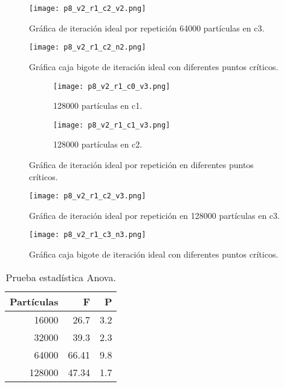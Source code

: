 \documentclass{article}
\begin{document}
\begin{figure}[H]
\centering
\texttt{[image: p8\_v2\_r1\_c2\_v2.png]}
\caption{\label{fig3} Gráfica de iteración ideal por repetición 64000 partículas en c3.}
\end{figure}

\begin{figure}[H]
\centering
\texttt{[image: p8\_v2\_r1\_c2\_n2.png]}
\caption{\label{fig3} Gráfica caja bigote de iteración ideal con diferentes puntos críticos.}
\end{figure}

\begin{figure}[H]
\centering
\begin{subfigure}[b]{0.40\linewidth}
\texttt{[image: p8\_v2\_r1\_c0\_v3.png]}
\caption{128000 partículas en c1.}
\end{subfigure}
\begin{subfigure}[b]{0.40\linewidth}
\texttt{[image: p8\_v2\_r1\_c1\_v3.png]}
\caption{128000 partículas en c2.}
\end{subfigure}
\caption{Gráfica de iteración ideal por repetición en diferentes puntos críticos.}
\label{fig:westminster}
\end{figure}

\begin{figure}[H]
\centering
\texttt{[image: p8\_v2\_r1\_c2\_v3.png]}
\caption{\label{fig3} Gráfica de iteración ideal por repetición en 128000 partículas en c3.}
\end{figure}

\begin{figure}[H]
\centering
\texttt{[image: p8\_v2\_r1\_c3\_n3.png]}
\caption{\label{fig3} Gráfica caja bigote de iteración ideal con diferentes puntos críticos.}
\end{figure}

\begin{table}[h!]
\centering
\caption{Prueba estadística Anova.}
 \begin{tabular}{||r r r||} 
 \hline
 Partículas & F & P  \\ [0.5ex] 
 \hline\hline
 16000 & 26.7 & 3.2 \\
 \hline
 32000 & 39.3 & 2.3\\ 
 \hline
 64000 & 66.41 & 9.8  \\
 \hline
 128000 & 47.34 & 1.7 \\
 \hline
\end{tabular}
\label{table:1}
\end{table}

\newpage
\printbibliography
\end{document}
